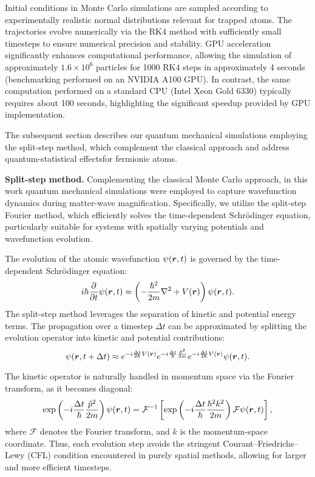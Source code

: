 Initial conditions in Monte Carlo simulations are sampled according to experimentally realistic normal distributions relevant for trapped atoms. The trajectories evolve numerically via the RK4 method with sufficiently small timesteps to ensure numerical precision and stability. GPU acceleration significantly enhances computational performance, allowing the simulation of approximately $1.6 \times 10^6$ particles for 1000 RK4 steps in approximately 4 seconds (benchmarking performed on an NVIDIA A100 GPU). In contrast, the same computation performed on a standard CPU (Intel Xeon Gold 6330) typically requires about 100 seconds, highlighting the significant speedup provided by GPU implementation. 

The subsequent section describes our quantum mechanical simulations employing the split-step method, which complement the classical approach and address quantum-statistical effectsfor fermionic atoms.


\textbf{Split-step method.}
Complementing the classical Monte Carlo approach, in this work quantum mechanical simulations were employed to capture wavefunction dynamics during matter-wave magnification. Specifically, we utilize the split-step Fourier method, which efficiently solves the time-dependent Schrödinger equation, particularly suitable for systems with spatially varying potentials and wavefunction evolution.

The evolution of the atomic wavefunction $\psi(\boldsymbol{r}, t)$ is governed by the time-dependent Schrödinger equation:
\begin{equation*}
i\hbar\frac{\partial}{\partial t}\psi(\boldsymbol{r}, t) = \left(-\frac{\hbar^2}{2m}\nabla^2 + V(\boldsymbol{r})\right)\psi(\boldsymbol{r}, t).
\end{equation*}
The split-step method leverages the separation of kinetic and potential energy terms. The propagation over a timestep $\Delta t$ can be approximated by splitting the evolution operator into kinetic and potential contributions:
\begin{equation*}
\psi(\boldsymbol{r}, t + \Delta t) \approx e^{-i\frac{\Delta t}{2\hbar}V(\boldsymbol{r})} e^{-i\frac{\Delta t}{\hbar}\frac{\hat{p}^2}{2m}} e^{-i\frac{\Delta t}{2\hbar}V(\boldsymbol{r})}\psi(\boldsymbol{r}, t).
\end{equation*}

The kinetic operator is naturally handled in momentum space via the Fourier transform, as it becomes diagonal:
\begin{equation*}
\exp\left(-i\frac{\Delta t}{\hbar}\frac{\hat{p}^2}{2m}\right)\psi(\boldsymbol{r}, t) = \mathcal{F}^{-1}\left[\exp\left(-i\frac{\Delta t}{\hbar}\frac{\hbar^2 k^2}{2m}\right)\mathcal{F}{\psi(\boldsymbol{r}, t)}\right],
\end{equation*}
where $\mathcal{F}$ denotes the Fourier transform, and $k$ is the momentum-space coordinate. Thus, each evolution step avoids the stringent Courant–Friedrichs–Lewy (CFL) condition encountered in purely spatial methods, allowing for larger and more efficient timesteps.

